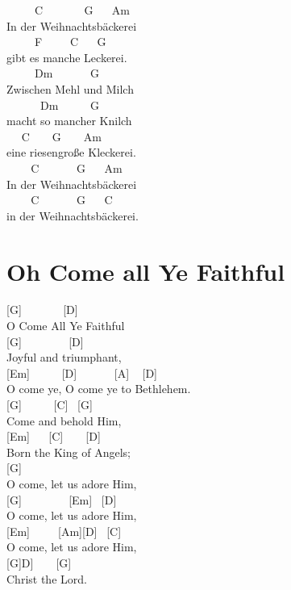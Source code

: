\documentclass[
  letterpaper,
  twoside=false]{scrbook}
\begin{document}
~ ~ ~ C ~ ~ ~ ~ G ~ ~Am\\
In der Weihnachtsbäckerei\\
\hspace*{0.333em} ~ ~ ~ F ~ ~ ~C ~ ~G\\
gibt es manche Leckerei. ~ ~\\
\hspace*{0.333em} ~ ~ ~ Dm ~ ~ ~ ~G\\
Zwischen Mehl und Milch ~\\
\hspace*{0.333em} ~ ~ ~ ~Dm ~ ~ ~ G\\
macht so mancher Knilch ~ ~\\
\hspace*{0.333em} ~ ~C ~ ~ G ~ ~ Am\\
eine riesengroße Kleckerei.\\
\hspace*{0.333em} ~ ~ ~C ~ ~ ~ ~G ~ ~Am\\
In der Weihnachtsbäckerei ~\\
\hspace*{0.333em} ~ ~ ~C ~ ~ ~ ~G ~ ~C\\
in der Weihnachtsbäckerei.

\hypertarget{oh-come-all-ye-faithful}{%
\chapter{Oh Come all Ye Faithful}\label{oh-come-all-ye-faithful}}

{[}G{]} ~ ~ ~ ~ {[}D{]}\\
O Come All Ye Faithful\\
{[}G{]} ~ ~ ~ ~ ~{[}D{]}\\
Joyful and triumphant,\\
{[}Em{]} ~ ~ ~ {[}D{]} ~ ~ ~ ~{[}A{]} ~ {[}D{]}\\
O come ye, O come ye to Bethlehem.\\
{[}G{]} ~ ~ ~ {[}C{]} ~{[}G{]}\\
Come and behold Him,\\
{[}Em{]} ~ ~{[}C{]} ~ ~ {[}D{]}\\
Born the King of Angels;\\
{[}G{]}\\
O come, let us adore Him,\\
{[}G{]} ~ ~ ~ ~ ~{[}Em{]} ~{[}D{]}\\
O come, let us adore Him,\\
{[}Em{]} ~ ~ ~{[}Am{]}{[}D{]} ~{[}C{]}\\
O come, let us adore Him,\\
{[}G{]}D{]} ~ ~ {[}G{]}\\
Christ the Lord.
\end{document}
